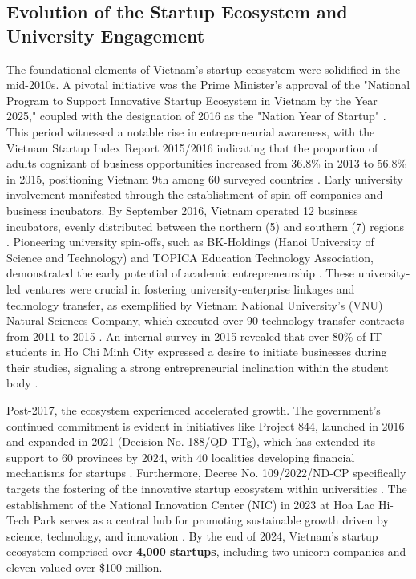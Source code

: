 \documentclass[../Main.tex]{subfiles}
\begin{document}
	\subsection{Evolution of the Startup Ecosystem and University Engagement}
	The foundational elements of Vietnam's startup ecosystem were solidified in the mid-2010s. A pivotal initiative was the Prime Minister's approval of the "National Program to Support Innovative Startup Ecosystem in Vietnam by the Year 2025," coupled with the designation of 2016 as the "Nation Year of Startup" \cite{dinh2017promoting}. This period witnessed a notable rise in entrepreneurial awareness, with the Vietnam Startup Index Report 2015/2016 indicating that the proportion of adults cognizant of business opportunities increased from 36.8\% in 2013 to 56.8\% in 2015, positioning Vietnam 9th among 60 surveyed countries \cite{dinh2017promoting}. Early university involvement manifested through the establishment of spin-off companies and business incubators. By September 2016, Vietnam operated 12 business incubators, evenly distributed between the northern (5) and southern (7) regions \cite{dinh2017promoting}. Pioneering university spin-offs, such as BK-Holdings (Hanoi University of Science and Technology) and TOPICA Education Technology Association, demonstrated the early potential of academic entrepreneurship \cite{dinh2017promoting}. These university-led ventures were crucial in fostering university-enterprise linkages and technology transfer, as exemplified by Vietnam National University's (VNU) Natural Sciences Company, which executed over 90 technology transfer contracts from 2011 to 2015 \cite{dinh2017promoting}. An internal survey in 2015 revealed that over 80\% of IT students in Ho Chi Minh City expressed a desire to initiate businesses during their studies, signaling a strong entrepreneurial inclination within the student body \cite{dinh2017promoting}.

	Post-2017, the ecosystem experienced accelerated growth. The government's continued commitment is evident in initiatives like Project 844, launched in 2016 and expanded in 2021 (Decision No. 188/QD-TTg), which has extended its support to 60 provinces by 2024, with 40 localities developing financial mechanisms for startups \cite{nssc2024project}. Furthermore, Decree No. 109/2022/ND-CP specifically targets the fostering of the innovative startup ecosystem within universities \cite{nssc2024project}. The establishment of the National Innovation Center (NIC) in 2023 at Hoa Lac Hi-Tech Park serves as a central hub for promoting sustainable growth driven by science, technology, and innovation \cite{vietnam_innovation_report_2024}. By the end of 2024, Vietnam's startup ecosystem comprised over \textbf{4,000 startups}, including two unicorn companies and eleven valued over \$100 million.
\end{document}
